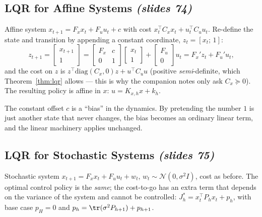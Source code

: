 \documentclass[11pt,a4paper]{article}
\newcommand{\slides}[1]{\emph{(slides #1)}}
\theoremstyle{plain}
\theoremstyle{definition}
\theoremstyle{remark}
\begin{document}
\subsection{LQR for Affine Systems \slides{74}}

Affine system $x_{t+1}=F_xx_t+F_uu_t+c$ with cost $x_t^\top C_xx_t+u_t^\top C_uu_t$. Re-define the state and transition by appending a constant coordinate, $z_t=[x_t;\,1]$:
\[
z_{t+1}=\begin{bmatrix}x_{t+1}\\1\end{bmatrix}=\begin{bmatrix}F_x&c\\0&1\end{bmatrix}\begin{bmatrix}x_t\\1\end{bmatrix}+\begin{bmatrix}F_u\\0\end{bmatrix}u_t=F_x'z_t+F_u'u_t,
\]
and the cost on $z$ is $z^\top\mathrm{diag}(C_x,0)z+u^\top C_uu$ (positive \emph{semi}-definite, which Theorem~\ref{thm:lqr} allows --- this is why the companion notes only ask $C_x\succeq0$). The resulting policy is affine in $x$: $u=K_{x,h}x+k_h$.
\begin{intuition}
The constant offset $c$ is a ``bias'' in the dynamics. By pretending the number $1$ is just another state that never changes, the bias becomes an ordinary linear term, and the linear machinery applies unchanged.
\end{intuition}

\subsection{LQR for Stochastic Systems \slides{75}}

Stochastic system $x_{t+1}=F_xx_t+F_uu_t+w_t$, $w_t\sim\mathcal N(0,\sigma^2I)$, cost as before. The optimal control policy is the \emph{same}; the cost-to-go has an extra term that depends on the variance of the system and cannot be controlled: $J^*_h=x_t^\top P_hx_t+p_h$, with base case $p_H=0$ and $p_h=\tr(\sigma^2P_{h+1})+p_{h+1}$.
\end{document}
